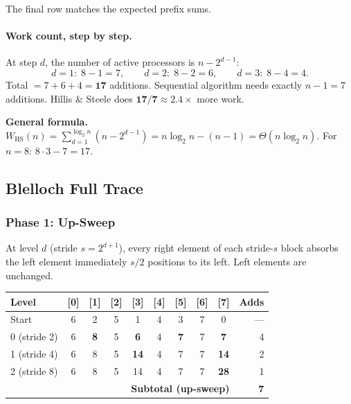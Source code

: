 \noindent The final row matches the expected prefix sums. \checkmark

\paragraph{Work count, step by step.}
At step $d$, the number of active processors is $n - 2^{d-1}$:
\[
d=1:\; 8-1=7, \qquad d=2:\; 8-2=6, \qquad d=3:\; 8-4=4.
\]
Total $= 7 + 6 + 4 = \mathbf{17}$ additions.
Sequential algorithm needs exactly $n-1 = 7$ additions.
Hillis \& Steele does $\mathbf{17/7 \approx 2.4\times}$ more work.

\begin{ppnote}
\textbf{General formula.}
$W_{\mathrm{HS}}(n)
= \sum_{d=1}^{\log_2 n}(n - 2^{d-1})
= n\log_2 n - (n-1)
= \Theta(n\log_2 n)$.
For $n = 8$: $8 \cdot 3 - 7 = 17$. \checkmark
\end{ppnote}

\subsection{Blelloch Full Trace}

\subsubsection*{Phase 1: Up-Sweep}

At level $d$ (stride $s = 2^{d+1}$), every right element of each
stride-$s$ block absorbs the left element immediately $s/2$ positions
to its left. Left elements are unchanged.

\begin{center}
\renewcommand{\arraystretch}{1.25}
\begin{tabular}{lccccccccr}
\toprule
\textbf{Level} & [0] & [1] & [2] & [3] & [4] & [5] & [6] & [7]
               & \textbf{Adds} \\
\midrule
Start          & 6 & 2 & 5 & 1 & 4 & 3 & 7 & 0 & --- \\
0 (stride 2)   & 6 & \textbf{8} & 5 & \textbf{6} & 4 & \textbf{7} & 7 & \textbf{7} & 4 \\
1 (stride 4)   & 6 & 8 & 5 & \textbf{14} & 4 & 7 & 7 & \textbf{14} & 2 \\
2 (stride 8)   & 6 & 8 & 5 & 14 & 4 & 7 & 7 & \textbf{28} & 1 \\
\midrule
\multicolumn{9}{r}{\textbf{Subtotal (up-sweep)}} & \textbf{7} \\
\bottomrule
\end{tabular}
\end{center}

